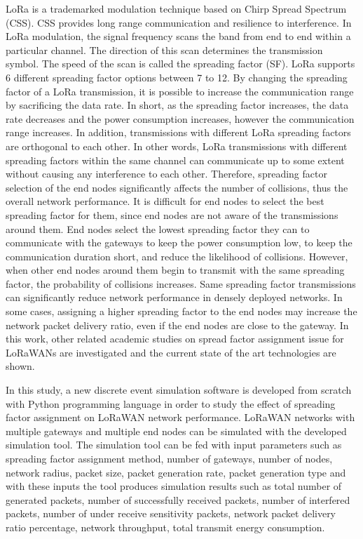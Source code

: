LoRa is a trademarked modulation technique based on Chirp Spread Spectrum (CSS). CSS provides long range communication and resilience to interference. In LoRa modulation, the signal frequency scans the band from end to end within a particular channel. The direction of this scan determines the transmission symbol. The speed of the scan is called the spreading factor (SF). LoRa supports 6 different spreading factor options between 7 to 12. By changing the spreading factor of a LoRa transmission, it is possible to increase the communication range by sacrificing the data rate. In short, as the spreading factor increases, the data rate decreases and the power consumption increases, however the communication range increases. In addition, transmissions with different LoRa spreading factors are orthogonal to each other. In other words, LoRa transmissions with different spreading factors within the same channel can communicate up to some extent without causing any interference to each other. Therefore, spreading factor selection of the end nodes significantly affects the number of collisions, thus the overall network performance. It is difficult for end nodes to select the best spreading factor for them, since end nodes are not aware of the transmissions around them. End nodes select the lowest spreading factor they can to communicate with the gateways to keep the power consumption low, to keep the communication duration short, and reduce the likelihood of collisions. However, when other end nodes around them begin to transmit with the same spreading factor, the probability of collisions increases. Same spreading factor transmissions can significantly reduce network performance in densely deployed networks. In some cases, assigning a higher spreading factor to the end nodes may increase the network packet delivery ratio, even if the end nodes are close to the gateway. In this work, other related academic studies on spread factor assignment issue for LoRaWANs are investigated and the current state of the art technologies are shown.

In this study, a new discrete event simulation software is developed from scratch with Python programming language in order to study the effect of spreading factor assignment on LoRaWAN network performance. LoRaWAN networks with multiple gateways and multiple end nodes can be simulated with the developed simulation tool. The simulation tool can be fed with input parameters such as spreading factor assignment method, number of gateways, number of nodes, network radius, packet size, packet generation rate, packet generation type and with these inputs the tool produces simulation results such as total number of generated packets, number of successfully received packets, number of interfered packets, number of under receive sensitivity packets, network packet delivery ratio percentage, network throughput, total transmit energy consumption.

